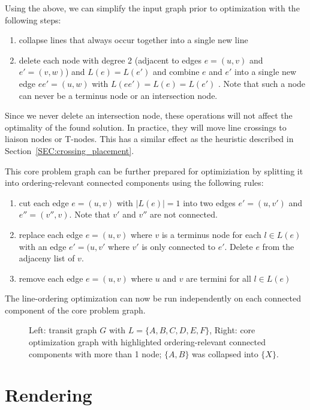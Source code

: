 \documentclass{llncs}
\begin{document}
Using the above, we can simplify the input graph prior to optimization with the following steps:
\begin{enumerate}
\item collapse lines that always occur together into a single new line
\item delete each node with degree 2 (adjacent to edges $e = (u, v)$ and $e' = (v, w)$) and $L(e) = L(e')$ and combine $e$ and $e'$ into a single new edge $ee' = (u, w)$ with $L(ee') = L(e) = L(e')$ . Note that such a node can never be a terminus node or an intersection node.
\end{enumerate}
Since we never delete an intersection node, these operations will not affect the optimality of the found solution. In practice, they will move line crossings to liaison nodes or T-nodes. This has a similar effect as the heuristic described in Section~\ref{SEC:crossing_placement}.

This core problem graph can be further prepared for optimiziation by splitting it into ordering-relevant connected components using the following rules:
\begin{enumerate}
	\item cut each edge $e = (u, v)$ with $|L(e)| = 1$ into two edges $e' = (u, v')$ and $e'' = (v'', v)$. Note that $v'$ and $v''$ are not connected.
	\item replace each edge $e = (u, v)$ where $v$ is a terminus node for each $l \in L(e)$ with an edge $e' = (u, v'$ where $v'$ is only connected to $e'$. Delete $e$ from the adjaceny list of $v$.
	\item remove each edge $e = (u, v)$ where $u$ and $v$ are termini for all $l \in L(e)$
\end{enumerate}
The line-ordering optimization can now be run independently on each connected component of the core problem graph.
\begin{figure}[h]
\centering
	
	\hspace{0.6cm}
	
	\caption{Left: transit graph $G$ with $L = \{A, B, C, D, E, F\}$, Right: core optimization graph with highlighted ordering-relevant connected components with more than 1 node; $\{A, B\}$ was collapsed into $\{X\}$.}
\end{figure}

%
\section{Rendering}\label{SEC:rendering}
%
\end{document}
